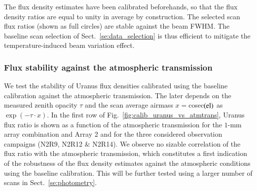 The flux density estimates have been calibrated beforehands, so that
the flux density ratios are equal to unity in average by construction.
The selected scan flux ratios (shown as full circles) are stable
against the beam FWHM. The baseline scan selection of
Sect.~\ref{se:data_selection} is thus efficient to mitigate the
temperature-induced beam variation effect.


\subsubsection{Flux stability against the atmospheric transmission}
\label{se:baseline_calibration_atm}

We test the stability of Uranus flux densities calibrated using the
baseline calibration against the atmospheric transmission. The later
depends on the measured zenith opacity $\tau$ and the scan
average airmass $x = $cosec$(\rm{el})$ as $\exp{(-\tau \cdot x)}$. In
the first row of Fig.~\ref{fig:calib_uranus_vs_atmtrans}, Uranus flux ratio
is shown as a function of the atmospheric
transmission for the $1$-mm array combination and Array 2 and for the
three considered observation campaigns (N2R9, N2R12 $\&$ N2R14). We
observe no sizable correlation of the flux ratio with the atmospheric
transmission, which constitutes a first
indication of the robustness of the flux density estimates against the
atmospheric conditions using the baseline calibration. This will be
further tested using a larger number of scans in Sect.~\ref{se:photometry}.
%
